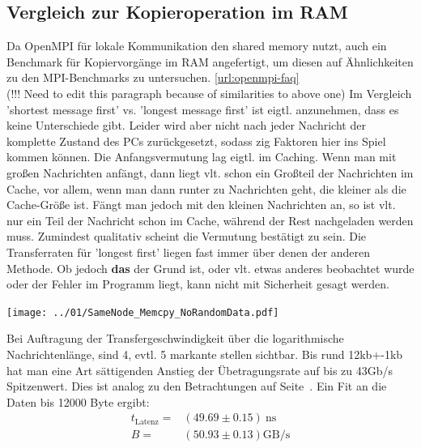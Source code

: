 \documentclass[12pt,a4paper]{article}
\begin{document}
\subsection{Vergleich zur Kopieroperation im RAM}


\label{sct:memcpy}

Da OpenMPI für lokale Kommunikation den shared memory nutzt, auch ein Benchmark für Kopiervorgänge im RAM angefertigt, um diesen auf Ähnlichkeiten zu den MPI-Benchmarks zu untersuchen. \ref{url:openmpi-faq}\\

(!!! Need to edit this paragraph because of similarities to above one) Im Vergleich 'shortest message first' vs. 'longest message first' ist eigtl. anzunehmen, dass es keine Unterschiede gibt. Leider wird aber nicht nach jeder Nachricht der komplette Zustand des PCs zurückgesetzt, sodass zig Faktoren hier ins Spiel kommen können. Die Anfangsvermutung lag eigtl. im Caching. Wenn man mit großen Nachrichten anfängt, dann liegt vlt. schon ein Großteil der Nachrichten im Cache, vor allem, wenn man dann runter zu Nachrichten geht, die kleiner als die Cache-Größe ist. Fängt man jedoch mit den kleinen Nachrichten an, so ist vlt. nur ein Teil der Nachricht schon im Cache, während der Rest nachgeladen werden muss. Zumindest qualitativ scheint die Vermutung bestätigt zu sein. Die Transferraten für 'longest first' liegen fast immer über denen der anderen Methode. Ob jedoch \textbf{das} der Grund ist, oder vlt. etwas anderes beobachtet wurde oder der Fehler im Programm liegt, kann nicht mit Sicherheit gesagt werden.\\

\begin{center}
	\centering
	\captionsetup{type=figure}
	\begin{minipage}{\linewidth}
		\texttt{[image: ../01/SameNode\_Memcpy\_NoRandomData.pdf]}
	\end{minipage}
	\label{fig:SameNode_Memcpy_NoRandomData}
\end{center}

Bei Auftragung der Transfergeschwindigkeit über die logarithmische Nachrichtenlänge, sind 4, evtl. 5 markante stellen sichtbar. 
Bis rund 12kb+-1kb hat man eine Art sättigenden Anstieg der Übetragungsrate auf bis zu 43Gb/s Spitzenwert. Dies ist analog zu den Betrachtungen auf Seite~\pageref{pg:latencyfunc}. Ein Fit an die Daten bis 12000 Byte ergibt:
\begin{eqnarray}
	t_\text{Latenz}  =& (49.69 \pm 0.15) \SI{}{\nano\second} \\
	B                =& (50.93 \pm 0.13) \text{GB/s}
\end{eqnarray}
\end{document}
